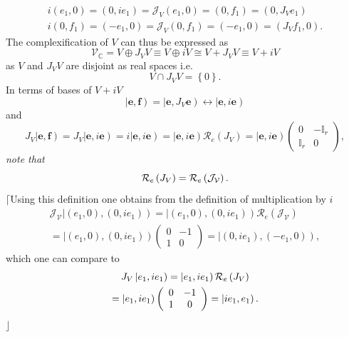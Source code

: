 \documentclass[aps,preprint]{revtex4}
\begin{document}
\begin{gather}
i\left( e_{1},0\right) =\left( 0,ie_{1}\right) =\mathcal{J}_{V}\left(
e_{1},0\right) =\left( 0,f_{1}\right) =\left( 0,J_{V}e_{1}\right) \\
i\left( 0,f_{1}\right) =\left( -e_{1},0\right) =\mathcal{J}_{V}\left(
0,f_{1}\right) =\left( -e_{1},0\right) =\left( J_{V}f_{1},0\right) .
\end{gather}
The complexification of $V$ can thus be expressed as 
\begin{equation}
\mathcal{V}_{\mathbb{C}}=V\oplus J_{V}V\equiv V\oplus iV\cong V+J_{V}V\equiv
V+iV
\end{equation}
as $V$ and $J_{V}V$ are disjoint as real spaces i.e. 
\begin{equation}
V\cap J_{V}V=\left\{ 0\right\} .
\end{equation}
In terms of bases of $V+iV$ 
\begin{equation}
\left\vert \mathbf{e,f}\right) =\left\vert \mathbf{e,}J_{V}\mathbf{e}\right)
\leftrightarrow\left\vert \mathbf{e,}i\mathbf{e}\right)
\end{equation}
and 
\begin{equation}
J_{V}\left\vert \mathbf{e,f}\right) =J_{V}\left\vert \mathbf{e,}i\mathbf{e}%
\right) =i\left\vert \mathbf{e,}i\mathbf{e}\right) =\left\vert \mathbf{e,}i%
\mathbf{e}\right) \mathcal{R}_{e}\left( J_{V}\right) =\left\vert \mathbf{e,}i%
\mathbf{e}\right) \left( 
\begin{array}{cc}
0 & -\mathbb{I}_{r} \\ 
\mathbb{I}_{r} & 0%
\end{array}
\right) ,
\end{equation}
\emph{note that} 
\begin{equation}
\mathcal{R}_{e}\left( J_{V}\right) =\mathcal{R}_{e}\left( \mathcal{J}_{%
\mathcal{V}}\right) .
\end{equation}
$\lceil$Using this definition one obtains from the definition of
multiplication by $i$ 
\begin{gather}
\mathcal{J}_{\mathcal{V}}\left\vert \left( e_{1},0\right) ,\left(
0,ie_{1}\right) \right) =\left\vert \left( e_{1},0\right) ,\left(
0,ie_{1}\right) \right) \mathcal{R}_{e}\left( \mathcal{J}_{\mathcal{V}%
}\right) \\
=\left\vert \left( e_{1},0\right) ,\left( 0,ie_{1}\right) \right) \left( 
\begin{array}{cc}
0 & -1 \\ 
1 & 0%
\end{array}
\right) =\left\vert \left( 0,ie_{1}\right) ,\left( -e_{1},0\right) \right) ,
\end{gather}
which one can compare to%
\begin{gather}
J_{V}\left\vert e_{1},ie_{1}\right) =\left\vert e_{1},ie_{1}\right) \mathcal{%
R}_{e}\left( J_{V}\right) \\
=\left\vert e_{1},ie_{1}\right) \left( 
\begin{array}{cc}
0 & -1 \\ 
1 & 0%
\end{array}
\right) =\left\vert ie_{1},e_{1}\right) .
\end{gather}
$\rfloor$
\end{document}
